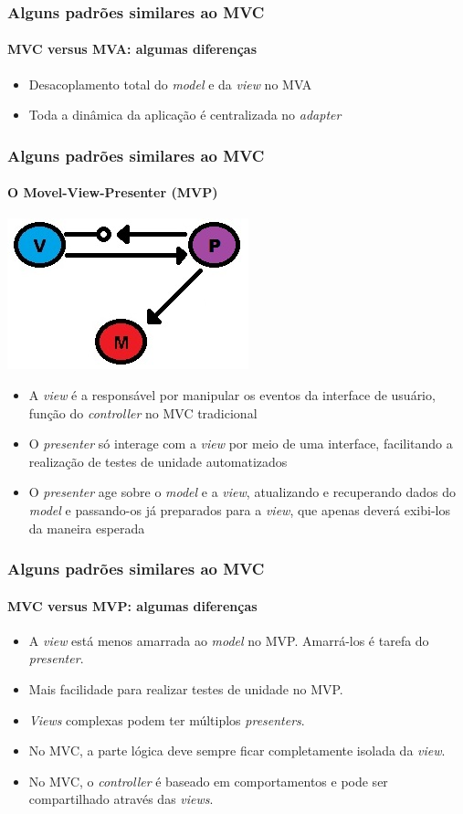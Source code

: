 \documentclass{beamer}
\begin{document}
\begin{frame}
\frametitle{Alguns padrões similares ao MVC}
\framesubtitle{MVC versus MVA: algumas diferenças}
\begin{itemize}
	\item Desacoplamento total do \textit{model} e da \textit{view} no MVA
	\item Toda a dinâmica da aplicação é centralizada no \textit{adapter}
\end{itemize}
\end{frame}

\begin{frame}
\frametitle{Alguns padrões similares ao MVC}
\framesubtitle{O Movel-View-Presenter (MVP)}
	\begin{center}
		\includegraphics[scale=0.3]{MVP.jpg}
	\end{center}
	\begin{itemize}
    \item A \textit{view} é a responsável por manipular os eventos da interface de usuário, função do \textit{controller} no MVC tradicional
    \item O \textit{presenter} só interage com a \textit{view} por meio de uma interface, facilitando a realização de testes de unidade automatizados
    \item O \textit{presenter} age sobre o \textit{model} e a \textit{view}, atualizando e recuperando dados do \textit{model} e passando-os já preparados para a \textit{view}, que apenas deverá exibi-los da maneira esperada
\end{itemize}
\end{frame}

\begin{frame}
\frametitle{Alguns padrões similares ao MVC}
\framesubtitle{MVC versus MVP: algumas diferenças}
\begin{itemize}
	\item A \textit{view} está menos amarrada ao \textit{model} no MVP. Amarrá-los é tarefa do \textit{presenter}.\\
	\item Mais facilidade para realizar testes de unidade no MVP.\\
	\item \textit{Views} complexas podem ter múltiplos \textit{presenters}.
	\item No MVC, a parte lógica deve sempre ficar completamente isolada da \textit{view}.
	\item No MVC, o \textit{controller} é baseado em comportamentos e pode ser compartilhado através das \textit{views}.
\end{itemize}
\end{frame}
\end{document}
